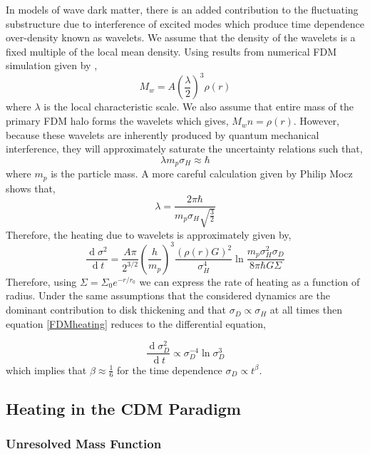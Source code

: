 \documentclass[usenatbib]{mnras}
\renewcommand{\d}[1]{\! \mathrm{d}#1 \:}
\newcommand{\deriv}[2]{\frac{\d{#1}}{\d{#2}}}
\renewcommand{\d}[1]{\ensuremath{\operatorname{d}\!{#1}}}
\begin{document}
In models of wave dark matter, there is an added contribution to the fluctuating substructure due to interference of excited modes which produce time dependence over-density known as wavelets. We assume that the density of the wavelets is a fixed multiple of the local mean density. Using results from numerical FDM simulation given by \cite{BECDM},
\begin{equation}
M_w = A \left(\frac{\lambda}{2} \right)^3 \rho(r) 
\end{equation}  
where $\lambda$ is the local characteristic scale. We also assume that entire mass of the primary FDM halo forms the wavelets which gives, $M_w n = \rho(r)$. However, because these wavelets are inherently produced by quantum mechanical interference, they will approximately saturate the uncertainty relations such that,
\begin{equation}
\lambda m_p \sigma_H \approx \hbar
\end{equation}
where $m_p$ is the particle mass. 
A more careful calculation given by Philip Mocz \citep{BECDM} shows that,
\[ \lambda = \frac{ 2 \pi \hbar}{m_p \sigma_H \sqrt{\frac{3}{2}}} \]
Therefore, the heating due to wavelets is approximately given by,
\begin{equation} \label{FDMheating}
\deriv{\sigma^2}{t} = \frac{A \pi}{2^{3/2}} \left( \frac{h}{m_p} \right)^3 \frac{(\rho(r) G)^2}{\sigma_H^4} \ln{\frac{m_p\sigma_H^2 \sigma_D}{8 \pi \hbar G \Sigma}}
\end{equation}
Therefore, using $\Sigma = \Sigma_0 e^{-r/r_0}$ we can express the rate of heating as a function of radius. Under the same assumptions that the considered dynamics are the dominant contribution to disk thickening and that $\sigma_D \propto \sigma_H$ at all times then equation \ref{FDMheating} reduces to the differential equation,


\begin{equation}
\deriv{\sigma_D^2}{t} \propto \sigma_D^{-4} \ln{\sigma_D^3} 
\end{equation} 
which implies that $\beta \approx \frac{1}{6}$ for the time dependence $\sigma_D \propto t^\beta$. 

\subsection{Heating in the CDM Paradigm}

\subsubsection{Unresolved Mass Function}
\end{document}

